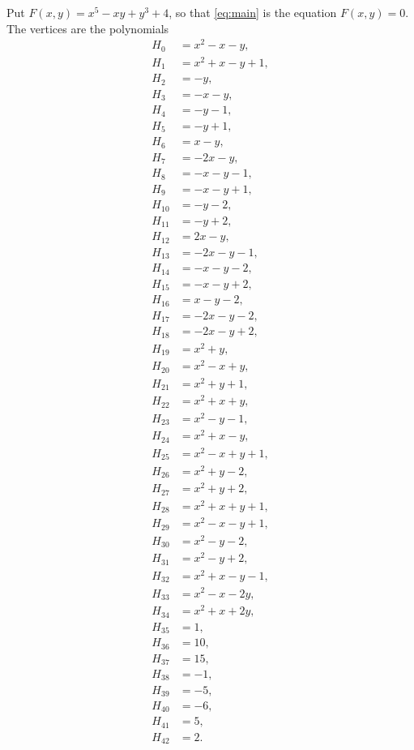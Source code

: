 \documentclass[11pt]{article}
\begin{document}
Put $F(x,y)=x^{5}-xy+y^{3}+4$, so that \eqref{eq:main} is the equation $F(x,y)=0$. The vertices are the polynomials
\begin{align*}
H_{0}&=x^{2}-x-y,\\
H_{1}&=x^{2}+x-y+1,\\
H_{2}&=-y,\\
H_{3}&=-x-y,\\
H_{4}&=-y-1,\\
H_{5}&=-y+1,\\
H_{6}&=x-y,\\
H_{7}&=-2x-y,\\
H_{8}&=-x-y-1,\\
H_{9}&=-x-y+1,\\
H_{10}&=-y-2,\\
H_{11}&=-y+2,\\
H_{12}&=2x-y,\\
H_{13}&=-2x-y-1,\\
H_{14}&=-x-y-2,\\
H_{15}&=-x-y+2,\\
H_{16}&=x-y-2,\\
H_{17}&=-2x-y-2,\\
H_{18}&=-2x-y+2,\\
H_{19}&=x^{2}+y,\\
H_{20}&=x^{2}-x+y,\\
H_{21}&=x^{2}+y+1,\\
H_{22}&=x^{2}+x+y,\\
H_{23}&=x^{2}-y-1,\\
H_{24}&=x^{2}+x-y,\\
H_{25}&=x^{2}-x+y+1,\\
H_{26}&=x^{2}+y-2,\\
H_{27}&=x^{2}+y+2,\\
H_{28}&=x^{2}+x+y+1,\\
H_{29}&=x^{2}-x-y+1,\\
H_{30}&=x^{2}-y-2,\\
H_{31}&=x^{2}-y+2,\\
H_{32}&=x^{2}+x-y-1,\\
H_{33}&=x^{2}-x-2y,\\
H_{34}&=x^{2}+x+2y,\\
H_{35}&=1,\\
H_{36}&=10,\\
H_{37}&=15,\\
H_{38}&=-1,\\
H_{39}&=-5,\\
H_{40}&=-6,\\
H_{41}&=5,\\
H_{42}&=2.
\end{align*}
\end{document}
